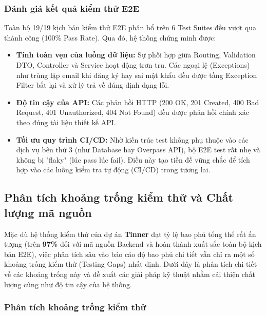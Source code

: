 \subsubsection{Đánh giá kết quả kiểm thử E2E}
Toàn bộ 19/19 kịch bản kiểm thử E2E phân bổ trên 6 Test Suites đều vượt qua thành công (100\% Pass Rate). Qua đó, hệ thống chứng minh được:
\begin{itemize}
    \item \textbf{Tính toàn vẹn của luồng dữ liệu:} Sự phối hợp giữa Routing, Validation DTO, Controller và Service hoạt động trơn tru. Các ngoại lệ (Exceptions) như trùng lặp email khi đăng ký hay sai mật khẩu đều được tầng Exception Filter bắt lại và xử lý trả về đúng định dạng lỗi.
    \item \textbf{Độ tin cậy của API:} Các phản hồi HTTP (200 OK, 201 Created, 400 Bad Request, 401 Unauthorized, 404 Not Found) đều được phản hồi chính xác theo đúng tài liệu thiết kế API.
    \item \textbf{Tối ưu quy trình CI/CD:} Nhờ kiến trúc test không phụ thuộc vào các dịch vụ bên thứ 3 (như Database hay Overpass API), bộ E2E test rất nhẹ và không bị "flaky" (lúc pass lúc fail). Điều này tạo tiền đề vững chắc để tích hợp vào các luồng kiểm tra tự động (CI/CD) trong tương lai.
\end{itemize}

\subsection{Phân tích khoảng trống kiểm thử và Chất lượng mã nguồn}
\label{subsec:gap_analysis}

Mặc dù hệ thống kiểm thử của dự án \textbf{Tinner} đạt tỷ lệ bao phủ tổng thể rất ấn tượng (trên \textbf{97\%} đối với mã nguồn Backend và hoàn thành xuất sắc toàn bộ kịch bản E2E), việc phân tích sâu vào báo cáo độ bao phủ chi tiết vẫn chỉ ra một số khoảng trống kiểm thử (Testing Gaps) nhất định. Dưới đây là phân tích chi tiết về các khoảng trống này và đề xuất các giải pháp kỹ thuật nhằm cải thiện chất lượng cũng như độ tin cậy của hệ thống.

\subsubsection{Phân tích khoảng trống kiểm thử}

